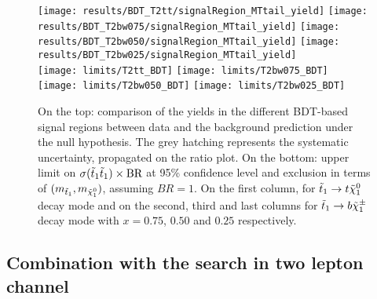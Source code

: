     \begin{landscape}
        \thispagestyle{empty}
        \vspace*{1cm}
    \begin{figure}[h!]
        \centering
        \texttt{[image: results/BDT\_T2tt/signalRegion\_MTtail\_yield]}
        \texttt{[image: results/BDT\_T2bw075/signalRegion\_MTtail\_yield]}
        \texttt{[image: results/BDT\_T2bw050/signalRegion\_MTtail\_yield]}
        \texttt{[image: results/BDT\_T2bw025/signalRegion\_MTtail\_yield]}\\
        \texttt{[image: limits/T2tt\_BDT]}
        \texttt{[image: limits/T2bw075\_BDT]}
        \texttt{[image: limits/T2bw050\_BDT]}
        \texttt{[image: limits/T2bw025\_BDT]}
        \caption{On the top: comparison of the yields in the different BDT-based signal
        regions between data and the background prediction under the null hypothesis. The
        grey hatching represents the systematic uncertainty, propagated on the ratio plot.
        On the bottom: upper limit on $\sigma(\tilde{t}_1\tilde{t}_1) \times \text{BR}$ at 95\% confidence level and exclusion in terms of
        $(m_{\tilde{t}_1},m_{\tilde{\chi}_1^0})$, assuming
        $BR = 1$. On the first column, for $\tilde{t}_1 \rightarrow t \tilde{\chi}_1^0$ decay mode and on
        the second, third and last columns for $\tilde{t}_1 \rightarrow b \tilde{\chi}_1^\pm$ decay mode
        with $x=0.75$, $0.50$ and $0.25$ respectively.}
        \label{fig:resultsBDT}
    \end{figure}
    \end{landscape}
    \restoregeometry

    \subsection{Combination with the search in two lepton channel}

